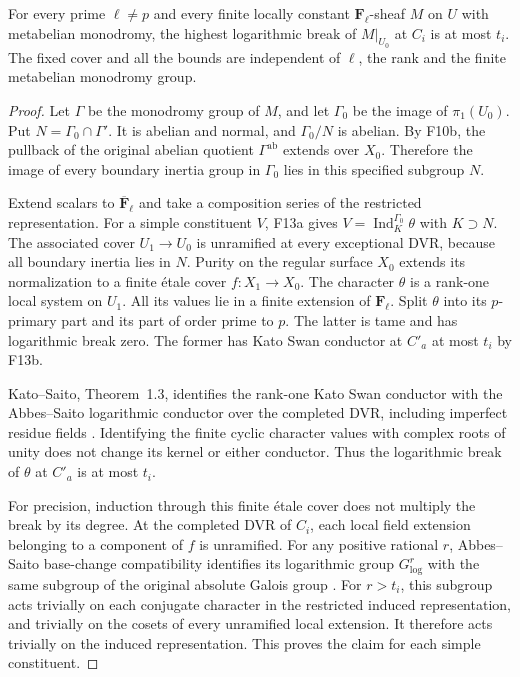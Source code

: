 \begin{proposition}
For every prime $\ell\ne p$ and every finite locally constant
$\mathbf F_\ell$-sheaf $M$ on $U$ with metabelian monodromy,
the highest logarithmic break of $M|_{U_0}$ at $C_i$ is at most
$t_i$. The fixed cover and all the bounds are independent of
$\ell$, the rank and the finite metabelian monodromy group.
\end{proposition}
\begin{proof}
Let $\Gamma$ be the monodromy group of $M$, and let
$\Gamma_0$ be the image of $\pi_1(U_0)$. Put
$N=\Gamma_0\cap\Gamma'$. It is abelian and normal, and
$\Gamma_0/N$ is abelian. By F10b, the pullback of the original
abelian quotient $\Gamma^{\mathrm{ab}}$ extends over $X_0$.
Therefore the image of every boundary inertia group in
$\Gamma_0$ lies in this specified subgroup $N$.

Extend scalars to $\overline{\mathbf F}_\ell$ and take a
composition series of the restricted representation. For a
simple constituent $V$, F13a gives
$V=\operatorname{Ind}_K^{\Gamma_0}\theta$ with $K\supset N$.
The associated cover $U_1\to U_0$ is unramified at every
exceptional DVR, because all boundary inertia lies in $N$.
Purity on the regular surface $X_0$ extends its normalization
to a finite \'etale cover $f:X_1\to X_0$.
The character $\theta$ is a rank-one local system on $U_1$.
All its values lie in a finite extension of $\mathbf F_\ell$.
Split $\theta$ into its $p$-primary part and its part of order
prime to $p$. The latter is tame and has logarithmic break zero.
The former has Kato Swan conductor at $C'_a$ at most $t_i$
by F13b.

Kato--Saito, Theorem~1.3, identifies the rank-one Kato Swan
conductor with the Abbes--Saito logarithmic conductor over the
completed DVR, including imperfect residue fields
\cite[Theorem~1.3, p.~2]{KatoSaito2019}.
Identifying the finite cyclic character values with complex
roots of unity does not change its kernel or either conductor.
Thus the logarithmic break of $\theta$ at $C'_a$ is at most
$t_i$.

For precision, induction through this finite \'etale cover does
not multiply the break by its degree. At the completed DVR of
$C_i$, each local field extension belonging to a component of
$f$ is unramified. For any positive rational $r$, Abbes--Saito
base-change compatibility identifies its logarithmic group
$G^r_{\log}$ with the same subgroup of the original absolute
Galois group \cite[Proposition~3.15(3)]{AbbesSaito2002}.
For $r>t_i$, this subgroup acts trivially on each conjugate
character in the restricted induced representation, and trivially
on the cosets of every unramified local extension. It therefore
acts trivially on the induced representation. This proves the
claim for each simple constituent.


\end{proof}
